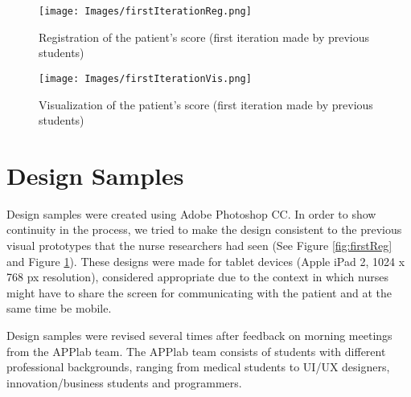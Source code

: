 %
%




\begin{figure}
\centering
\begin{minipage}{0.5\textwidth}
\centering
\texttt{[image: Images/firstIterationReg.png]}
			\caption{Registration of the patient's score (first iteration made by previous students)} \label{fig:firstReg}
\end{minipage}\hfill
\begin{minipage}{0.5\textwidth}
\centering
\texttt{[image: Images/firstIterationVis.png]}
			\caption{Visualization of the patient's score (first iteration made by previous students)} \label{fig:firstVis}
\end{minipage}
\end{figure}

\section{Design Samples}
Design samples were created using Adobe Photoshop CC. In order to show continuity in the process, we tried to make the design consistent to the previous visual prototypes that the nurse researchers had seen (See Figure \ref{fig:firstReg} and Figure \ref{fig:firstVis}). These designs were made for tablet devices (Apple iPad 2, 1024 x 768 px resolution), considered appropriate due to the context in which nurses might have to share the screen for communicating with the patient and at the same time be mobile. 

Design samples were revised several times after feedback on morning meetings from the APPlab team. The APPlab team consists of students with different professional backgrounds, ranging from medical students to UI/UX designers, innovation/business students and programmers. 

